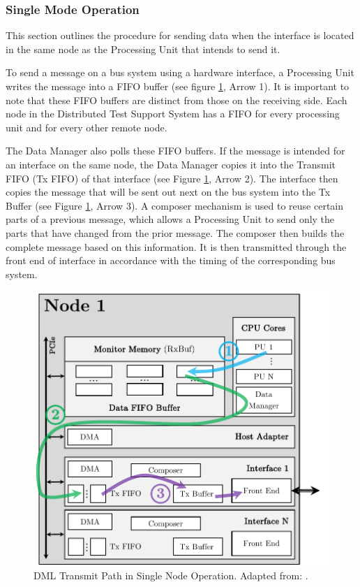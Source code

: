 \subsubsection{Single Mode Operation}
This section outlines the procedure for sending data when the interface is located in the same node as the Processing Unit that intends to send it.

To send a message on a bus system using a hardware interface, a Processing Unit writes the message into a FIFO buffer (see figure \ref{fig:DmlTransSingleNode}, Arrow 1). It is important to note that these FIFO buffers are distinct from those on the receiving side. Each node in the Distributed Test Support System has a FIFO for every processing unit and for every other remote node.

The Data Manager also polls these FIFO buffers. If the message is intended for an interface on the same node, the Data Manager copies it into the Transmit FIFO (Tx FIFO) of that interface (see Figure \ref{fig:DmlTransSingleNode}, Arrow 2). The interface then copies the message that will be sent out next on the bus system into the Tx Buffer (see Figure \ref{fig:DmlTransSingleNode}, Arrow 3). A composer mechanism is used to reuse certain parts of a previous message, which allows a Processing Unit to send only the parts that have changed from the prior message. The composer then builds the complete message based on this information. It is then transmitted through the front end of interface in accordance with the timing of the corresponding bus system. \\

\begin{figure}[!htbp]
    \centering
    \includegraphics[width=0.48\linewidth]{figures/dml/dml03a.pdf}
    \caption[DML Transmit Path in Single Node Operation]{DML Transmit Path in Single Node Operation. Adapted from: \cite{dml01}.}
    \label{fig:DmlTransSingleNode}
\end{figure}


